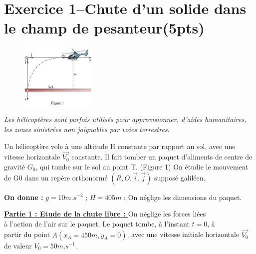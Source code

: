 \documentclass[12pt]{article}
\begin{document}
\section*{Exercice 1–Chute d’un solide dans le champ de pesanteur\dotfill(5pts)}


	\begin{figure}
  \begin{center}

	  \vspace{-1.6cm}
	\includegraphics[width=0.32\textwidth]{./img/ex_02.png}
  \end{center}
\end{figure}
	\emph{Les hélicoptères sont parfois utilisés pour approvisionner, d’aides humanitaires, les
zones sinistrées non joignables par voies terrestres.}

Un hélicoptère vole à une altitude H
constante par rapport au sol, avec une
vitesse horizontale $\vec{V_0}$ constante. Il
fait tomber un paquet d’aliments de
centre de gravité $G_0$, qui tombe sur le
sol au point T. (Figure 1)
On étudie le mouvement de G0 dans
un
repère
orthonormé $(R,O,\vec{i}, \vec{j})$
supposé galiléen.

\textbf{On donne :} $g = 10 m.s^{-2}$  ;  $H=405m$ ; On néglige les dimensions du paquet.

\textbf{\underline{Partie 1 : Etude de la chute libre : }}
On néglige les forces liées \\à l’action de l’air sur le paquet.
Le paquet tombe, à l’instant $t = 0$, à \\partir du point $A(x_A = 450 m, y_A = 0)$, avec une
vitesse initiale horizontale $\vec{V_0}$ de valeur $V_0 = 50 m.s^{-1}$.
\end{document}
